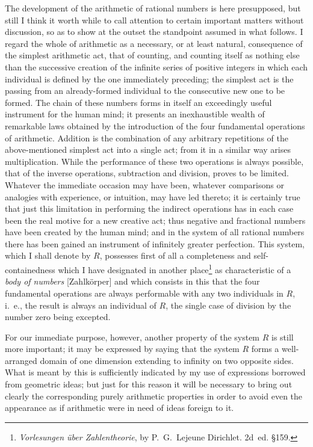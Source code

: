 \documentclass[polutonikogreek,english,twoside,openright]{article}
\begin{document}
The development of the arithmetic of rational numbers is here
presupposed, but still I think it worth while to call attention to
certain important matters without discussion, so as to show at the
outset the standpoint assumed in what follows. I regard the whole of
arithmetic as a necessary, or at least natural, consequence of the
simplest arithmetic act, that of counting, and counting itself as
nothing else than the successive creation of the infinite series of
positive integers in which each individual is defined by the one
immediately preceding; the simplest act is the passing from an
already-formed individual to the consecutive new one to be formed. The
chain of these numbers forms in itself an exceedingly useful
instrument for the human mind; it presents an inexhaustible wealth of
remarkable laws obtained by the introduction of the four fundamental
operations of arithmetic.  Addition is the combination of any
arbitrary repetitions of the above-mentioned simplest act into a
single act; from it in a similar way arises multiplication.  While the
performance of these two operations is always possible, that of the
inverse operations, subtraction and division, proves to be
limited. Whatever the immediate occasion may have been, whatever
comparisons or analogies with experience, or intuition, may have led
thereto; it is certainly true that just this limitation in performing
the indirect operations has in each case been the real motive for a
new creative act; thus negative and fractional numbers have been
created by the human mind; and in the system of all rational numbers
there has been gained an instrument of infinitely greater
perfection. This system, which I shall denote by $R$, possesses first
of all a completeness and self-containedness which I have designated
in another place\footnote{\textit{Vorlesungen über Zahlentheorie}, by
  P.~G.~Lejeune Dirichlet. 2d~ed. §159.} as characteristic of a
\textit{body of numbers} [Zahlkörper] and which consists in this that
the four fundamental operations are always performable with any two
individuals in $R$, i.~e., the result is always an individual of $R$,
the single case of division by the number zero being excepted.

For our immediate purpose, however, another property of the system $R$
is still more important; it may be expressed by saying that the system
$R$ forms a well-arranged domain of one dimension extending to
infinity on two opposite sides. What is meant by this is sufficiently
indicated by my use of expressions borrowed from geometric ideas; but
just for this reason it will be necessary to bring out clearly the
corresponding purely arithmetic properties in order to avoid even the
appearance as if arithmetic were in need of ideas foreign to it.
\end{document}
